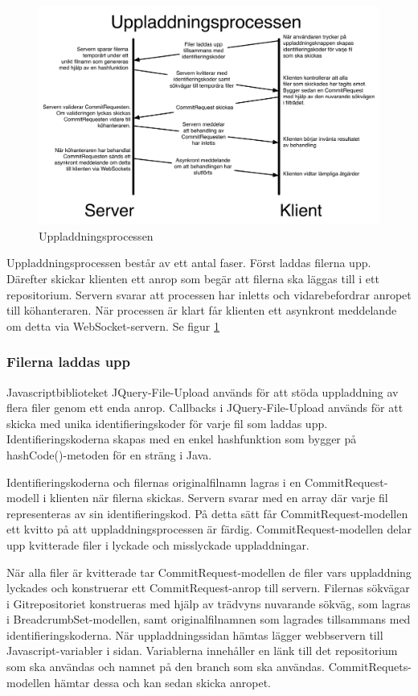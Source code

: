 \begin{figure}
  \includegraphics[width=15.0cm]{fig/misc/uppladdningsprocessen.pdf}             
  \caption[Uppladdningsprocessen]
  {Uppladdningsprocessen}
  \label{fig:uppladdning}
\end{figure}


Uppladdningsprocessen består av ett antal faser. Först laddas filerna upp. Därefter skickar klienten ett anrop som begär att filerna ska läggas till i ett repositorium. Servern svarar att processen har inletts och vidarebefordrar anropet till köhanteraren. När processen är klart får klienten ett asynkront meddelande om detta via WebSocket-servern. Se figur \ref{fig:uppladdning}

\subsubsection{Filerna laddas upp}

Javascriptbiblioteket JQuery-File-Upload används för att stöda uppladdning av flera filer genom ett enda anrop. 
Callbacks i JQuery-File-Upload används för att skicka med unika identifieringskoder för varje fil som laddas upp. Identifieringskoderna skapas med en enkel hashfunktion som bygger på hashCode()-metoden för en sträng i Java.

Identifieringskoderna och filernas originalfilnamn lagras i en CommitRequest-modell i klienten när filerna skickas. Servern svarar med en array där varje fil representeras av sin identifieringskod. På detta sätt får CommitRequest-modellen ett kvitto på att uppladdningsprocessen är färdig. CommitRequest-modellen delar upp kvitterade filer i lyckade och misslyckade uppladdningar. 

När alla filer är kvitterade tar CommitRequest-modellen de filer vars uppladdning lyckades och konstruerar ett CommitRequest-anrop till servern. Filernas sökvägar i Gitrepositoriet konstrueras med hjälp av trädvyns nuvarande sökväg, som lagras i BreadcrumbSet-modellen, samt originalfilnamnen som lagrades tillsammans med identifieringskoderna.
När uppladdningssidan hämtas lägger webbservern till Javascript-variabler i sidan. Variablerna innehåller en länk till det  repositorium som ska användas och namnet på den branch som ska användas. CommitRequets-modellen hämtar dessa och kan sedan skicka anropet.

